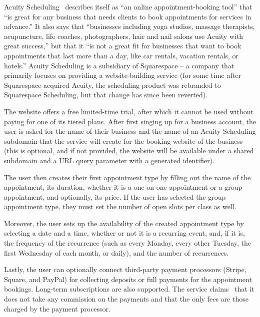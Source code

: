 Acuity Scheduling~\cite{acuity} describes itself as \enquote{an online appointment-booking tool} that \enquote{is great for any business that needs clients to book appointments for services in advance.} It also says that \enquote{businesses including yoga studios, massage therapists, acupuncture, life coaches, photographers, hair and nail salons use Acuity with great success,} but that it \enquote{is not a great fit for businesses that want to book appointments that last more than a day, like car rentals, vacation rentals, or hotels.} Acuity Scheduling is a subsidiary of Squarespace -- a company that primarily focuses on providing a website-building service (for some time after Squarespace acquired Acuity, the scheduling product was rebranded to Squarespace Scheduling, but that change has since been reverted).

The website offers a free limited-time trial, after which it cannot be used without paying for one of its tiered plans. After first singing up for a business account, the user is asked for the name of their business and the name of an Acuity Scheduling subdomain that the service will create for the booking website of the business (this is optional, and if not provided, the website will be available under a shared subdomain and a URL query parameter with a generated identifier).

The user then creates their first appointment type by filling out the name of the appointment, its duration, whether it is a one-on-one appointment or a group appointment, and optionally, its price. If the user has selected the group appointment type, they must set the number of open slots per class as well.

Moreover, the user sets up the availability of the created appointment type by selecting a date and a time, whether or not it is a recurring event, and, if it is, the frequency of the recurrence (such as every Monday, every other Tuesday, the first Wednesday of each month, or daily), and the number of recurrences.

Lastly, the user can optionally connect third-party payment processors (Stripe, Square, and PayPal) for collecting deposits or full payments for the appointment bookings. Long-term subscriptions are also supported. The service claims~\cite{acuity} that it does not take any commission on the payments and that the only fees are those charged by the payment processor.

